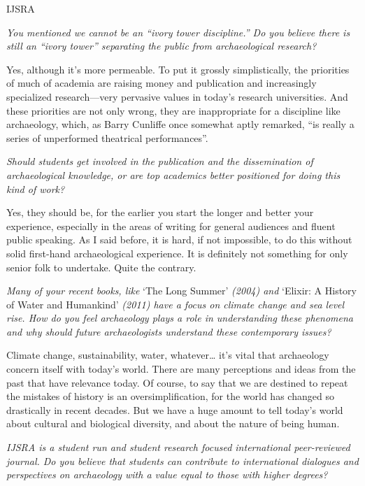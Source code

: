 \begin{labeling}{IJSRA}
\item[IJSRA] \textit{You mentioned we cannot be an “ivory tower discipline.” Do you believe there is still an “ivory tower” separating the public from archaeological research?}

\item[BMF] Yes, although it’s more permeable. To put it grossly simplistically, the priorities of much of academia are raising money and publication and increasingly specialized research—very pervasive values in today’s research universities. And these priorities are not only wrong, they are inappropriate for a discipline like archaeology, which, as Barry Cunliffe once somewhat aptly remarked, “is really a series of unperformed theatrical performances”.

\item[IJSRA] \textit{Should students get involved in the publication and the dissemination of archaeological knowledge, or are top academics better positioned for doing this kind of work?}

\item[BMF] Yes, they should be, for the earlier you start the longer and better your experience, especially in the areas of writing for general audiences and fluent public speaking. As I said before, it is hard, if not impossible, to do this without solid first-hand archaeological experience. It is definitely not something for only senior folk to undertake. Quite the contrary.
	
\item[IJSRA] \textit{Many of your recent books, like} ‘The Long Summer’ \textit{(2004) and} ‘Elixir: A History of Water and Humankind’ \textit{(2011) have a focus on climate change and sea level rise. How do you feel archaeology plays a role in understanding these phenomena and why should future archaeologists understand these contemporary issues?}
                
\item[BMF] Climate change, sustainability, water, whatever… it’s vital that archaeology concern itself with today’s world. There are many perceptions and ideas from the past that have relevance today. Of course, to say that we are destined to repeat the mistakes of history is an oversimplification, for the world has changed so drastically in recent decades. But we have a huge amount to tell today’s world about cultural and biological diversity, and about the nature of being human.

\item[IJSRA] \textit{IJSRA is a student run and student research focused international peer-reviewed journal. Do you believe that students can contribute to international dialogues and perspectives on archaeology with a value equal to those with higher degrees?}


\end{labeling}
